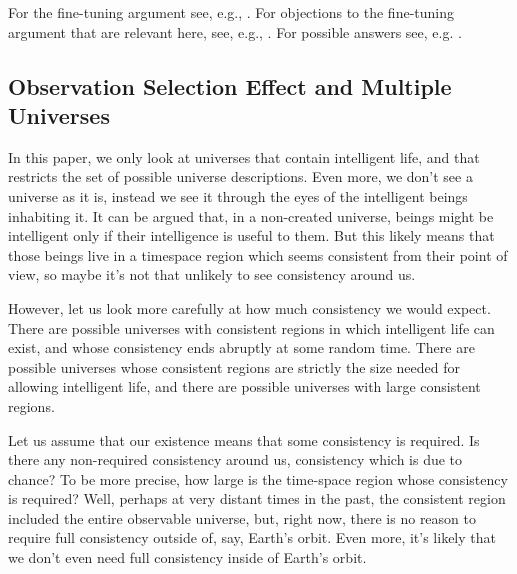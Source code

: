 \documentclass[a4paper
,draft
]{article}
\newcommand{\paper}[1]{paper}
\newcommand{\ghilimele}[1]{``#1"}
\begin{document}
For the fine-tuning argument see, e.g., \parencite{sep-fine-tuning}.
For objections to the fine-tuning argument that are relevant here, see, e.g.,
\parencites{Manson2003}{Manson2009}{McGrew2001}{Narveson2003}{Sober2009}.
For possible answers see, e.g.
\textcites{Leslie2003}{Swinburne2003}{Monton2006}{Kotzen2012}.



\subsection{Observation Selection Effect and Multiple Universes}

In this \paper{}, we only look at universes that contain intelligent life,
and that restricts the set of possible universe descriptions.
Even more, we don't see a universe as it is, instead we see it
through the eyes of the intelligent beings inhabiting it.
It can be argued that, in a non-created universe, beings might be intelligent
only if their intelligence is useful to them.
But this likely means that those beings live in a timespace region which seems
consistent from their point of view, so maybe it's not that unlikely to see
consistency around us.

However, let us look more carefully at how much consistency we would expect.
There are possible universes with consistent regions in which
intelligent life can exist, and whose consistency ends abruptly at some
random time. There are possible universes whose consistent regions are
strictly the size needed for allowing intelligent life, and there are possible
universes with large consistent regions.

Let us assume that our existence means that some consistency is required.
Is there any non-required consistency around us, consistency which is due to
chance? To be more precise,
how large is the time-space region whose consistency is required? Well,
perhaps at very distant times in the past, the consistent region included
the entire observable universe, but, right now, there is no reason to require
full consistency outside of, say, Earth's orbit. Even more,
it's likely that we don't even need full consistency inside of Earth's orbit.
\end{document}
